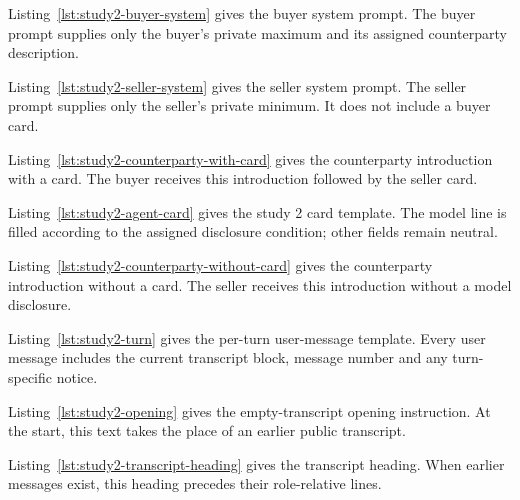 Listing~\ref{lst:study2-buyer-system} gives the buyer system prompt. The buyer prompt supplies only the buyer's private maximum and its assigned counterparty description.


Listing~\ref{lst:study2-seller-system} gives the seller system prompt. The seller prompt supplies only the seller's private minimum. It does not include a buyer card.


Listing~\ref{lst:study2-counterparty-with-card} gives the counterparty introduction with a card. The buyer receives this introduction followed by the seller card.


Listing~\ref{lst:study2-agent-card} gives the study 2 card template. The model line is filled according to the assigned disclosure condition; other fields remain neutral.


Listing~\ref{lst:study2-counterparty-without-card} gives the counterparty introduction without a card. The seller receives this introduction without a model disclosure.


Listing~\ref{lst:study2-turn} gives the per-turn user-message template. Every user message includes the current transcript block, message number and any turn-specific notice.


Listing~\ref{lst:study2-opening} gives the empty-transcript opening instruction. At the start, this text takes the place of an earlier public transcript.


Listing~\ref{lst:study2-transcript-heading} gives the transcript heading. When earlier messages exist, this heading precedes their role-relative lines.


